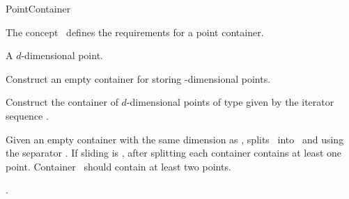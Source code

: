 

\begin{ccRefConcept}{PointContainer}


\begin{ccAdvanced}

\ccDefinition
  
The concept \ccRefName\ defines the requirements for
a point container. 


\ccTypes

 { A $d$-dimensional point.}
\ccCreation
{}  %

{
Construct an empty container for storing -dimensional points.
}

{
Construct the container of $d$-dimensional points of type 
given by the iterator sequence \ccc{[begin,end)}.
}

\ccOperations

{Given an empty container  with the same dimension as , splits \ccVar\ into
\ccVar\ and  using the separator . If sliding is , after splitting 
each container contains at least one point. Container \ccVar\ should contain at least two points.}

\ccHasModels

.

\ccSeeAlso

\\
\\

\end{ccAdvanced}
\end{ccRefConcept}



